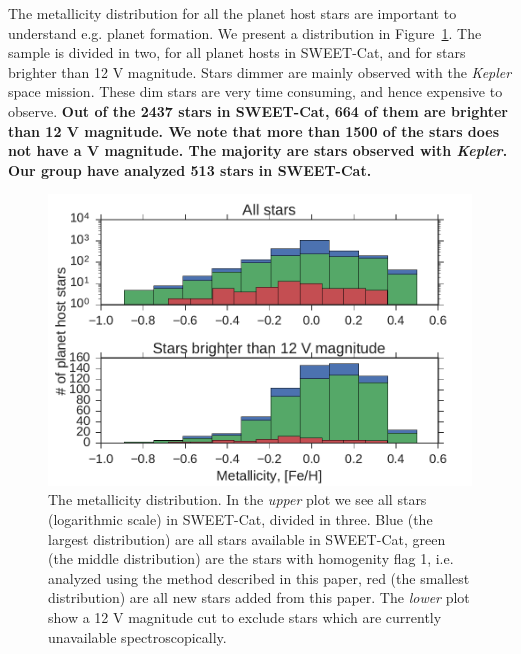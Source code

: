 \documentclass{aa}
\begin{document}
The metallicity distribution for all the planet host stars are important to
understand e.g. planet formation. We present a distribution in
Figure~\ref{fig:distribution}. The sample is divided in two, for all planet
hosts in SWEET-Cat, and for stars brighter than 12 V magnitude. Stars dimmer are
mainly observed with the \emph{Kepler} space mission. These dim stars are very
time consuming, and hence expensive to observe. {\bf Out of the 2437 stars in
SWEET-Cat, 664 of them are brighter than 12 V magnitude. We note that more than
1500 of the stars does not have a V magnitude. The majority are stars observed
with \emph{Kepler}. Our group have analyzed 513 stars in SWEET-Cat.}


\begin{figure}[tpb]
    \centering
    \includegraphics[width=1.0\linewidth,natwidth=450,natheight=300]{figures/metallicityDistribution.pdf}
    \caption{The metallicity distribution. In the \emph{upper} plot we see all
             stars (logarithmic scale) in SWEET-Cat, divided in three. Blue
             (the largest distribution) are all stars available in SWEET-Cat,
             green (the middle distribution) are the stars with homogenity flag
             1, i.e. analyzed using the method described in this paper, red
             (the smallest distribution) are all new stars added from this
             paper. The \emph{lower} plot show a 12 V magnitude cut to exclude
             stars which are currently unavailable spectroscopically.}
    \label{fig:distribution}
\end{figure}
\end{document}
